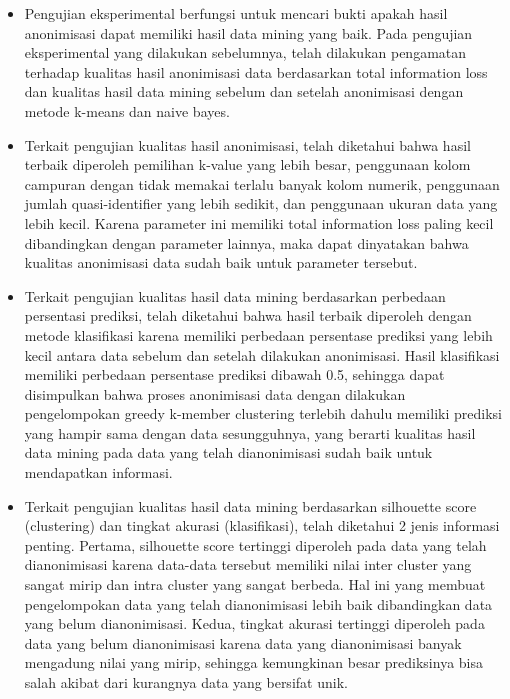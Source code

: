 \begin{itemize}
\item Pengujian eksperimental berfungsi untuk mencari bukti apakah hasil anonimisasi dapat memiliki hasil data mining yang baik. Pada pengujian eksperimental yang dilakukan sebelumnya, telah dilakukan pengamatan terhadap kualitas hasil anonimisasi data berdasarkan total information loss dan kualitas hasil data mining sebelum dan setelah anonimisasi dengan metode k-means dan naive bayes. 

\item Terkait pengujian kualitas hasil anonimisasi, telah diketahui bahwa hasil terbaik diperoleh pemilihan k-value yang lebih besar, penggunaan kolom campuran dengan tidak memakai terlalu banyak kolom numerik, penggunaan jumlah quasi-identifier yang lebih sedikit, dan penggunaan ukuran data yang lebih kecil. Karena parameter ini memiliki total information loss paling kecil dibandingkan dengan parameter lainnya, maka dapat dinyatakan bahwa kualitas anonimisasi data sudah baik untuk parameter tersebut.

\item Terkait pengujian kualitas hasil data mining berdasarkan perbedaan persentasi prediksi, telah diketahui bahwa hasil terbaik diperoleh dengan metode klasifikasi karena memiliki perbedaan persentase prediksi yang lebih kecil antara data sebelum dan setelah dilakukan anonimisasi. Hasil klasifikasi memiliki perbedaan persentase prediksi dibawah 0.5, sehingga dapat disimpulkan bahwa proses anonimisasi data dengan dilakukan pengelompokan greedy k-member clustering terlebih dahulu memiliki prediksi yang hampir sama dengan data sesungguhnya, yang berarti kualitas hasil data mining pada data yang telah dianonimisasi sudah baik untuk mendapatkan informasi.

\item Terkait pengujian kualitas hasil data mining berdasarkan silhouette score (clustering) dan tingkat akurasi (klasifikasi), telah diketahui 2 jenis informasi penting. Pertama, silhouette score tertinggi diperoleh pada data yang telah dianonimisasi karena data-data tersebut memiliki nilai inter cluster yang sangat mirip dan intra cluster yang sangat berbeda. Hal ini yang membuat pengelompokan data yang telah dianonimisasi lebih baik dibandingkan data yang belum dianonimisasi. Kedua, tingkat akurasi tertinggi diperoleh pada data yang belum dianonimisasi karena data yang dianonimisasi banyak mengadung nilai yang mirip, sehingga kemungkinan besar prediksinya bisa salah akibat dari kurangnya data yang bersifat unik.


\end{itemize}
